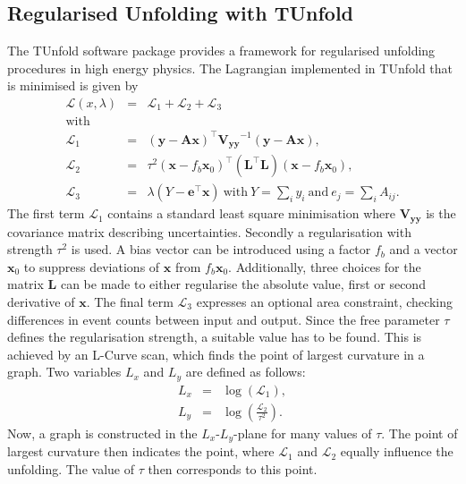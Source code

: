 \subsection{Regularised Unfolding with TUnfold}
	The TUnfold software package \cite{tunfold} provides a framework for regularised unfolding procedures in high energy physics. The Lagrangian implemented in TUnfold that is minimised is given by
	\begin{eqnarray}
	\label{eq:unfold_lagrange}
	\mathcal{L}(x,\lambda) &=& \mathcal{L}_1 + \mathcal{L}_2 + \mathcal{L}_3 
	\\ \nonumber \text{with}
	\\ 
	\label{eq:unfold_lagrange1}
	\mathcal{L}_1 &=& (\mathbf{y} - \mathbf{Ax})^\intercal \mathbf{V_{yy}}^{-1} (\mathbf{y} - \mathbf{Ax}),
	\\
	\label{eq:unfold_lagrange2}
	\mathcal{L}_2 &=& \tau^2 (\mathbf{x} - f_b \mathbf{x}_0)^\intercal (\mathbf{L}^\intercal \mathbf{L}) (\mathbf{x} - f_b \mathbf{x}_0),
	\\
	\label{eq:unfold_lagrange3}
	\mathcal{L}_3 &=& \lambda (Y-\mathbf{e}^\intercal \mathbf{x}) \ \text{with} \ Y=\sum_{i} y_i \ \text{and} \ e_j = \sum_{i}A_{ij}.
	\end{eqnarray}
	The first term $\mathcal{L}_1$ contains a standard least square minimisation where $\mathbf{V_{yy}}$ is the covariance matrix describing uncertainties. Secondly a regularisation with strength $\tau^2$ is used. A bias vector can be introduced using a factor $f_b$ and a vector $\mathbf{x}_0$ to suppress deviations of $\mathbf{x}$ from $f_b\mathbf{x}_0$. Additionally, three choices for the matrix $\mathbf{L}$ can be made to either regularise the absolute value, first or second derivative of $\mathbf{x}$. The final term $\mathcal{L}_3$ expresses an optional area constraint, checking differences in event counts between input and output. Since the free parameter $\tau$ defines the regularisation strength, a suitable value has to be found. This is achieved by an L-Curve scan, which finds the point of largest curvature in a graph. Two variables $L_x$ and $L_y$ are defined as follows:
	\begin{eqnarray}
	L_x  &=& \log \left(  \mathcal{L}_1 \right), \\
	L_y  &=& \log \left(  \frac{\mathcal{L}_2}{\tau^2} \right).
	\end{eqnarray}
	Now, a graph is constructed in the $L_x$-$L_y$-plane for many values of $\tau$. The point of largest curvature then indicates the point, where $\mathcal{L}_1$ and $\mathcal{L}_2$ equally influence the unfolding. The value of $\tau$ then corresponds to this point. 
	
